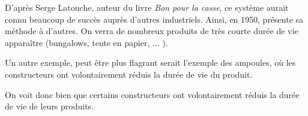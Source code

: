 D'après Serge Latouche, auteur du livre \textit{Bon pour la casse}\cite{bpc}, ce système aurait connu beaucoup de succès auprès d'autres industriels. Ainsi, en 1950, présente sa méthode à d'autres. On verra de nombreux produits de très courte durée de vie apparaître  (bungalows, tente en papier, ... ).

Un autre exemple, peut être plus flagrant serait l'exemple des ampoules, où les constructeurs ont volontairement réduis la durée de vie du produit. 

On voit donc bien que certains constructeurs ont volontairement réduis la durée de vie de leurs produits. 




